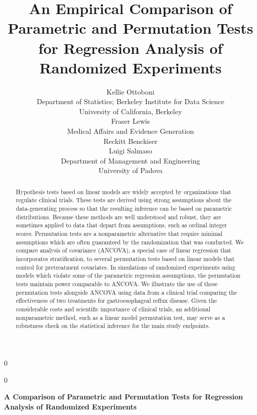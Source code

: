 \documentclass[12pt]{article}
\newcommand{\blind}{0}
\begin{document}
%

\def\spacingset#1{\renewcommand{\baselinestretch}%
{#1}\small\normalsize} \spacingset{1}



\blind
{
  \title{\bf An Empirical Comparison of Parametric and Permutation Tests for Regression Analysis of Randomized Experiments}
\author{Kellie Ottoboni \\
Department of Statistics; Berkeley Institute for Data Science\\
University of California, Berkeley \\ [.1in]
Fraser Lewis \\
Medical Affairs and Evidence Generation \\
Reckitt Benckiser\\  [.1in]
Luigi Salmaso\\
Department of Management and Engineering \\
University of Padova
}  \maketitle
} \fi

\blind
{
  \bigskip
  \bigskip
  \bigskip
  \begin{center}
    {\LARGE\bf  A Comparison of Parametric and Permutation Tests for Regression Analysis of Randomized Experiments}
\end{center}
  \medskip
} \fi

\bigskip
\begin{abstract}
Hypothesis tests based on linear models are widely accepted by organizations that regulate clinical trials.
These tests are derived using strong assumptions about the data-generating process so that the resulting inference can be based on parametric distributions.
Because these methods are well understood and robust, they are sometimes applied to data that depart from assumptions, such as ordinal integer scores.
Permutation tests are a nonparametric alternative that require minimal assumptions which are often guaranteed by the randomization that was conducted.
We compare analysis of covariance (ANCOVA), a special case of linear regression that incorporates stratification, to several permutation tests based on linear models that control for pretreatment covariates.
In simulations of randomized experiments using models which violate some of the parametric regression assumptions,
the permutation tests maintain power comparable to ANCOVA.
We illustrate the use of these permutation tests alongside ANCOVA using data from a clinical trial comparing the effectiveness of two treatments for gastroesophageal reflux disease.
Given the considerable costs and scientific importance of clinical trials, an additional nonparametric method, such as a linear model permutation test, may serve as a robustness check on the statistical inference for the main study endpoints.
\end{abstract}
\end{document}
